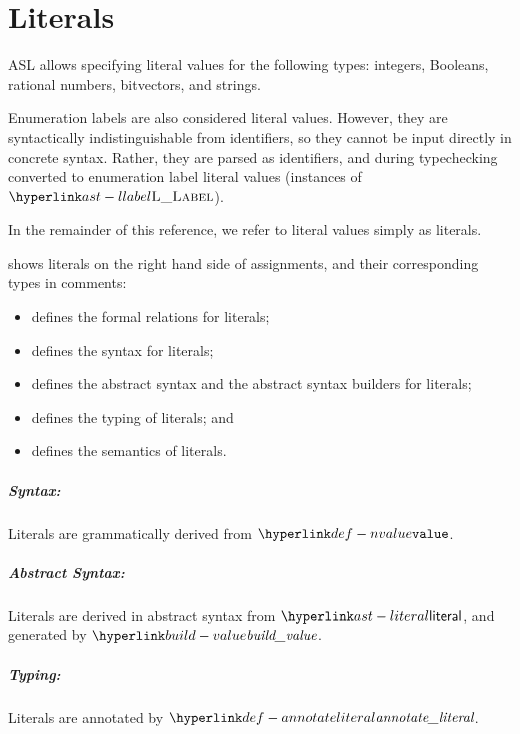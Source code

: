 \chapter{Literals\label{chap:Literals}}
ASL allows specifying literal values for the following types:
integers, Booleans, rational numbers, bitvectors, and strings.

Enumeration labels are also considered literal values.
However, they are syntactically indistinguishable from identifiers,
so they cannot be input directly in concrete syntax.
Rather, they are parsed as identifiers, and during typechecking
converted to enumeration label literal values (instances of $\llabel$).

In the remainder of this reference, we refer to literal values simply as literals.

 shows literals on the right hand side of assignments,
and their corresponding types in comments:

\ChapterOutline
\begin{itemize}
  \item {} defines the formal relations for literals;
  \item {} defines the syntax for literals;
  \item {} defines the abstract syntax and the abstract syntax builders for literals;
  \item {} defines the typing of literals; and
  \item {} defines the semantics of literals.
\end{itemize}

\paragraph{Syntax:} Literals are grammatically derived from $\Nvalue$.
\paragraph{Abstract Syntax:} Literals are derived in abstract syntax from $\literal$,
  and generated by $\buildvalue$.
\paragraph{Typing:} Literals are annotated by $\annotateliteralname$.
